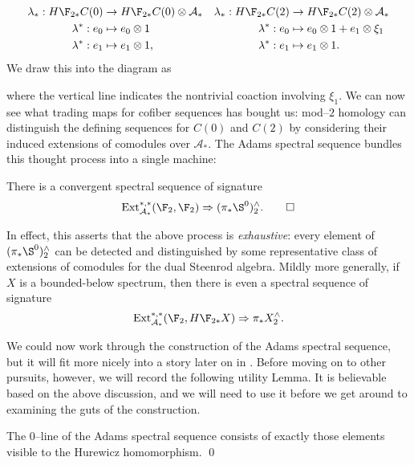 \begin{align*}
\lambda_*: H\F_{2*} C(0) & \to H\F_{2*} C(0) \otimes \mathcal A_* & \lambda_*: H\F_{2*} C(2) & \to H\F_{2*} C(2) \otimes \mathcal A_* \\
\lambda^*: e_0 & \mapsto e_0 \otimes 1 & \lambda^*: e_0 & \mapsto e_0 \otimes 1 + e_1 \otimes \xi_1 \\
\lambda^*: e_1 & \mapsto e_1 \otimes 1, & \lambda^*: e_1 & \mapsto e_1 \otimes 1.
\end{align*}
We draw this into the diagram as
\begin{center}
\end{center}
where the vertical line indicates the nontrivial coaction involving $\xi_1$.  We can now see what trading maps for cofiber sequences has bought us: mod--$2$ homology can distinguish the defining sequences for $C(0)$ and $C(2)$ by considering their induced extensions of comodules over $\mathcal A_*$.  The Adams spectral sequence bundles this thought process into a single machine:
\begin{theorem}
There is a convergent spectral sequence of signature \[\Ext_{\mathcal A_*}^{*, *}(\F_2, \F_2) \Rightarrow (\pi_* \S^0)^\wedge_2. \qed\]
\end{theorem}
In effect, this asserts that the above process is \emph{exhaustive}: every element of $(\pi_* \S^0)^\wedge_2$ can be detected and distinguished by some representative class of extensions of comodules for the dual Steenrod algebra.  Mildly more generally, if $X$ is a bounded-below spectrum, then there is even a spectral sequence of signature \[\Ext_{\mathcal A_*}^{*, *}(\F_2, H\F_{2*} X) \Rightarrow \pi_* X^\wedge_2.\]

We could now work through the construction of the Adams spectral sequence, but it will fit more nicely into a story later on in .  Before moving on to other pursuits, however, we will record the following utility Lemma.  It is believable based on the above discussion, and we will need to use it before we get around to examining the guts of the construction.
\begin{lemma}\label{HurewiczImageOnZeroLine}
The $0$--line of the Adams spectral sequence consists of exactly those elements visible to the Hurewicz homomorphism. \qed
\end{lemma}

